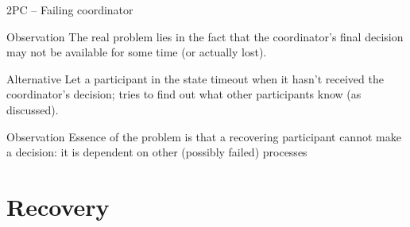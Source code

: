 \begin{slide}{2PC -- Failing coordinator}
  \begin{block}{Observation} 
    The real problem lies in the fact that the coordinator's final decision may not be available for some time
    (or actually lost).
  \end{block}
  \begin{block}{Alternative} 
    Let a participant  in the  state timeout when it hasn't received the coordinator's
    decision;  tries to find out what other participants know (as discussed).
  \end{block}
  \begin{block}{Observation} 
    Essence of the problem is that a recovering participant cannot make a  decision: it is
    dependent on other (possibly failed) processes
  \end{block}
\end{slide}
\section{Recovery}

